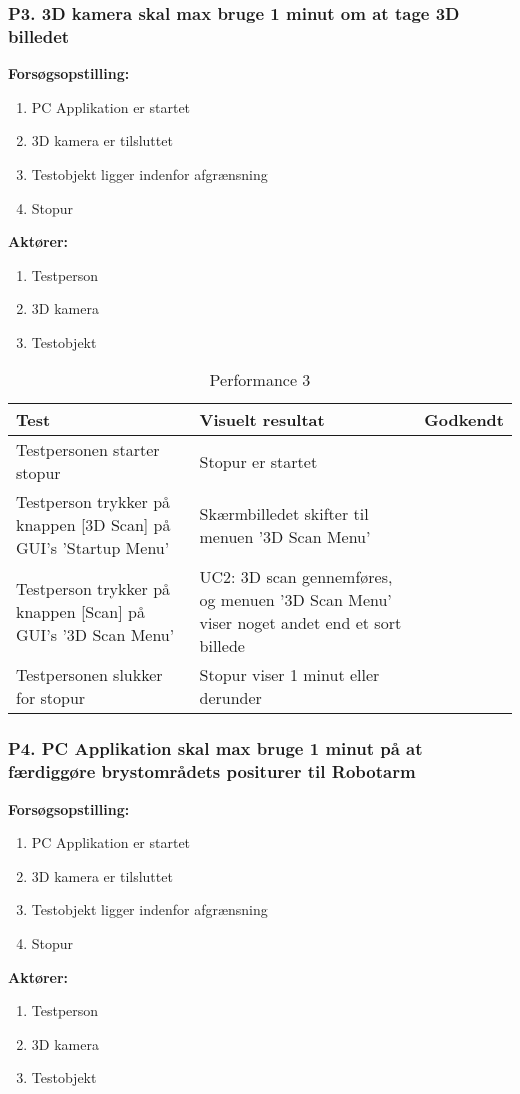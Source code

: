 \subsubsection{P3. 3D kamera skal max bruge 1 minut om at tage 3D billedet}
\textbf{Forsøgsopstilling:}
\begin{enumerate}
\item PC Applikation er startet
\item 3D kamera er tilsluttet
\item Testobjekt ligger indenfor afgrænsning
\item Stopur
\end{enumerate}
\textbf{Aktører:}
\begin{enumerate}
\item Testperson
\item 3D kamera 
\item Testobjekt
\end{enumerate}

\begin{table}[htb]
\begin{tabularx}{\textwidth}{|X|X|p{2cm}|}
\hline
\textbf{Test} & \textbf{Visuelt resultat} &\textbf{Godkendt}\\\hline  
Testpersonen starter stopur & Stopur er startet & \\ \hline
Testperson trykker på knappen [3D Scan] på GUI's 'Startup Menu' & Skærmbilledet skifter til menuen '3D Scan Menu' &  \\\hline
Testperson trykker på knappen [Scan] på GUI's '3D Scan Menu' & UC2: 3D scan gennemføres, og menuen '3D Scan Menu' viser noget andet end et sort billede & \\\hline
Testpersonen slukker for stopur & Stopur viser 1 minut eller derunder & \\\hline
\end{tabularx}
\caption{Performance 3}
\label{P3}
\end{table}
\newpage

\subsubsection{P4. PC Applikation skal max bruge 1 minut på at færdiggøre brystområdets positurer til Robotarm}
\textbf{Forsøgsopstilling:}
\begin{enumerate}
\item PC Applikation er startet
\item 3D kamera er tilsluttet
\item Testobjekt ligger indenfor afgrænsning
\item Stopur
\end{enumerate}
\textbf{Aktører:}
\begin{enumerate}
\item Testperson 
\item 3D kamera 
\item Testobjekt
\end{enumerate}

